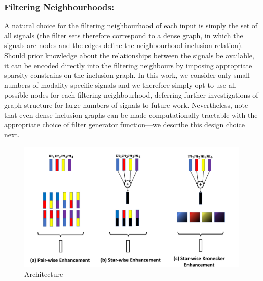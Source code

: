 \subsubsection{Filtering Neighbourhoods:} A natural choice for the filtering neighbourhood of each input is simply the set of all signals (the filter sets therefore correspond to a dense graph, in which the signals are nodes and the edges define the neighbourhood inclusion relation).  Should prior knowledge about the relationships between the signals be available, it can be encoded directly into the filtering neighbours by imposing appropriate sparsity constrains on the inclusion graph.  In this work, we consider only small numbers of modality-specific signals and we therefore simply opt to use all possible nodes for each filtering neighbourhood, deferring further investigations of graph structure for large numbers of signals to future work.  Nevertheless, note that even dense inclusion graphs can be made computationally tractable with the appropriate choice of filter generator function---we describe this design choice next.


\begin{figure}[t]
\begin{center}
        \includegraphics[scale=0.25]{filter_figure.pdf}
\end{center}
\vspace{-4mm}
   \caption{Architecture} 
\label{fig_archi}
\vspace{-5mm}
\end{figure}
